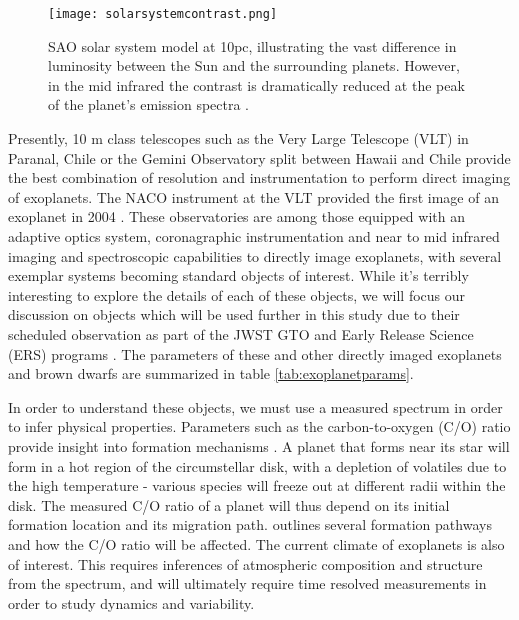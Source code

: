 \begin{figure}[t]
	\centering
	\texttt{[image: solarsystemcontrast.png]}
	\caption{SAO solar system model at 10pc, illustrating the vast difference in luminosity between the Sun and the surrounding planets. However, in the mid infrared the contrast is dramatically reduced at the peak of the planet's emission spectra \parencite{DesMarais2002}.}
	\label{fig:solarsystem}
\end{figure}
Presently, 10 m class telescopes such as the Very Large Telescope (VLT) in Paranal, Chile or the Gemini Observatory split between Hawaii and Chile provide the best combination of resolution and instrumentation to perform direct imaging of exoplanets.
The NACO instrument at the VLT provided the first image of an exoplanet in 2004 \parencite{Chauvin2004}.
These observatories are among those equipped with an adaptive optics system, coronagraphic instrumentation and near to mid infrared imaging and spectroscopic capabilities to directly image exoplanets, with several exemplar systems becoming standard objects of interest.
While it's terribly interesting to explore the details of each of these objects, we will focus our discussion on objects which will be used further in this study due to their scheduled observation as part of the JWST GTO and Early Release Science (ERS) programs \parencite{Beichman2019}. 
The parameters of these and other directly imaged exoplanets and brown dwarfs are summarized in table \ref{tab:exoplanetparams}. 

In order to understand these objects, we must use a measured spectrum in order to infer physical properties.
Parameters such as the carbon-to-oxygen (C/O) ratio provide insight into formation mechanisms \parencite{Madhusudhan2012}.
A planet that forms near its star will form in a hot region of the circumstellar disk, with a depletion of volatiles due to the high temperature - various species will freeze out at different radii within the disk. 
The measured C/O ratio of a planet will thus depend on its initial formation location and its migration path.
\parencite{Turrini2015} outlines several formation pathways and how the C/O ratio will be affected.
The current climate of exoplanets is also of interest. This requires inferences of atmospheric composition and structure from the spectrum, and will ultimately require time resolved measurements in order to study dynamics and variability. 


